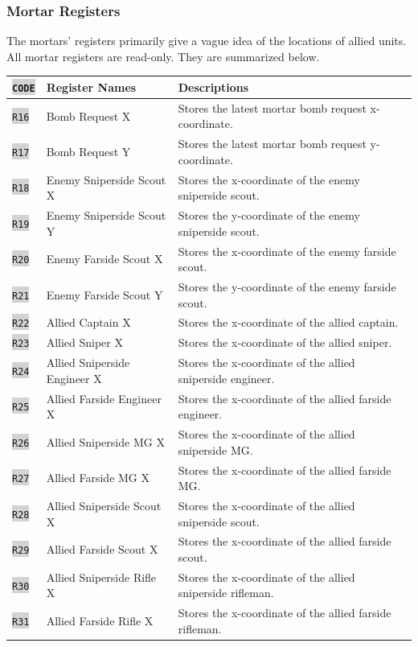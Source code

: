 \documentclass{article}
\newcommand{\vnscode}[1]{\colorbox{lightgray}{\lstinline[language=vns]{#1}}}
\begin{document}
\subsubsection{Mortar Registers}

The mortars' registers primarily give a vague idea of the locations of allied
units. All mortar registers are read-only. They are summarized below.

\begin{minipage}{\textwidth}
\centering
\begin{tabular}{lll}
    \hline \vnscode{CODE} & Register Names & Descriptions \\ \hline
    \vnscode{R16} & Bomb Request X & Stores the latest mortar bomb request x-coordinate. \\
    \vnscode{R17} & Bomb Request Y & Stores the latest mortar bomb request y-coordinate. \\
    \vnscode{R18} & Enemy Sniperside Scout X & Stores the x-coordinate of the enemy sniperside scout. \\
    \vnscode{R19} & Enemy Sniperside Scout Y & Stores the y-coordinate of the enemy sniperside scout. \\
    \vnscode{R20} & Enemy Farside Scout X & Stores the x-coordinate of the enemy farside scout. \\
    \vnscode{R21} & Enemy Farside Scout Y & Stores the y-coordinate of the enemy farside scout. \\
    \vnscode{R22} & Allied Captain X & Stores the x-coordinate of the allied captain. \\
    \vnscode{R23} & Allied Sniper X & Stores the x-coordinate of the allied sniper. \\
    \vnscode{R24} & Allied Sniperside Engineer X & Stores the x-coordinate of the allied sniperside engineer. \\
    \vnscode{R25} & Allied Farside Engineer X & Stores the x-coordinate of the allied farside engineer. \\
    \vnscode{R26} & Allied Sniperside MG X & Stores the x-coordinate of the allied sniperside MG. \\
    \vnscode{R27} & Allied Farside MG X & Stores the x-coordinate of the allied farside MG. \\
    \vnscode{R28} & Allied Sniperside Scout X & Stores the x-coordinate of the allied sniperside scout. \\
    \vnscode{R29} & Allied Farside Scout X & Stores the x-coordinate of the allied farside scout. \\
    \vnscode{R30} & Allied Sniperside Rifle X & Stores the x-coordinate of the allied sniperside rifleman. \\
    \vnscode{R31} & Allied Farside Rifle X & Stores the x-coordinate of the allied farside rifleman. \\
\end{tabular}
\end{minipage}
\end{document}

